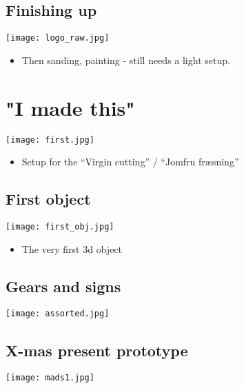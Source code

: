 \documentclass[11pt]{beamer}
\begin{document}
\subsection*{Finishing up}\begin{frame}[fragile]
\label{sec-5.4}

\texttt{[image: logo\_raw.jpg]}
\begin{itemize}
\item Then sanding, painting - still needs a light setup.
\end{itemize}
\end{frame}
\section{"I made this"}
\label{sec-6}

\texttt{[image: first.jpg]}
\begin{itemize}
\item Setup for the ``Virgin cutting'' / ``Jomfru fræsning''
\end{itemize}
\subsection*{First object}\begin{frame}[fragile]
\label{sec-6.1}

\texttt{[image: first\_obj.jpg]}
\begin{itemize}
\item The very first 3d object
\end{itemize}
\end{frame}
\subsection*{Gears and signs}\begin{frame}[fragile]
\label{sec-6.2}

\texttt{[image: assorted.jpg]}

\end{frame}
\subsection*{X-mas present prototype}\begin{frame}[fragile]
\label{sec-6.3}

\texttt{[image: mads1.jpg]}

\end{frame}
\end{document}
